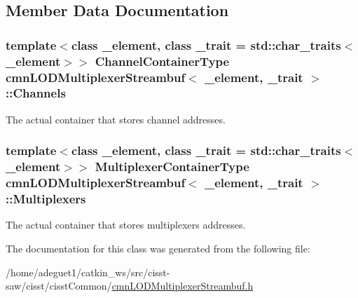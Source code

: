 \subsection{Member Data Documentation}
\hypertarget{classcmn_l_o_d_multiplexer_streambuf_a1a7cbbb28f587e83e402b6ea663bd387}{
\subsubsection[{Channels}]{\setlength{\rightskip}{0pt plus 5cm}template$<$class \-\_\-element, class \-\_\-trait = std\-::char\-\_\-traits$<$\-\_\-element$>$$>$ {\bf Channel\-Container\-Type} {\bf cmn\-L\-O\-D\-Multiplexer\-Streambuf}$<$ \-\_\-element, \-\_\-trait $>$\-::Channels\hspace{0.3cm}{\ttfamily [protected]}}}\label{classcmn_l_o_d_multiplexer_streambuf_a1a7cbbb28f587e83e402b6ea663bd387}
The actual container that stores channel addresses. \hypertarget{classcmn_l_o_d_multiplexer_streambuf_a775d4551d9e37fcca0c27f699a98b838}{
\subsubsection[{Multiplexers}]{\setlength{\rightskip}{0pt plus 5cm}template$<$class \-\_\-element, class \-\_\-trait = std\-::char\-\_\-traits$<$\-\_\-element$>$$>$ {\bf Multiplexer\-Container\-Type} {\bf cmn\-L\-O\-D\-Multiplexer\-Streambuf}$<$ \-\_\-element, \-\_\-trait $>$\-::Multiplexers\hspace{0.3cm}{\ttfamily [protected]}}}\label{classcmn_l_o_d_multiplexer_streambuf_a775d4551d9e37fcca0c27f699a98b838}
The actual container that stores multiplexers addresses. 

The documentation for this class was generated from the following file\-:\begin{DoxyCompactItemize}
\item 
/home/adeguet1/catkin\-\_\-ws/src/cisst-\/saw/cisst/cisst\-Common/\hyperlink{cmn_l_o_d_multiplexer_streambuf_8h}{cmn\-L\-O\-D\-Multiplexer\-Streambuf.\-h}\end{DoxyCompactItemize}
